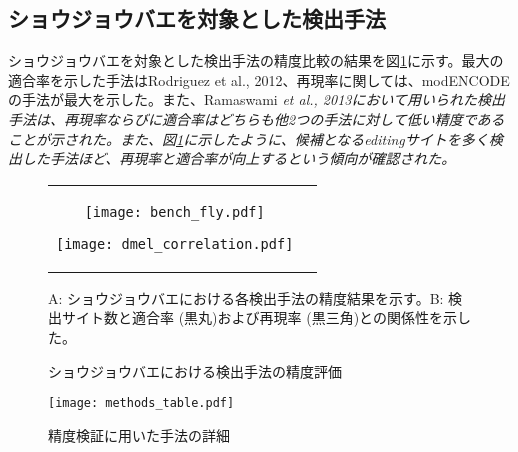 \subsection{ショウジョウバエを対象とした検出手法}
ショウジョウバエを対象とした検出手法の精度比較の結果を図\ref{fig:dmel_data}に示す。最大の適合率を示した手法はRodriguez et al., 2012、再現率に関しては、modENCODEの手法が最大を示した。また、Ramaswami \it{et al}\rm{}., 2013において用いられた検出手法は、再現率ならびに適合率はどちらも他2つの手法に対して低い精度であることが示された。また、図\ref{fig:dmel_data}に示したように、候補となるeditingサイトを多く検出した手法ほど、再現率と適合率が向上するという傾向が確認された。
\begin{figure}[htbp]
	\begin{tabular}{cc}
		\begin{minipage}{0.5\hsize}
				\centering
				\texttt{[image: bench\_fly.pdf]}
				\label{fig:dmel_pr}
		\end{minipage}
		\begin{minipage}{0.5\hsize}
				\centering
				\texttt{[image: dmel\_correlation.pdf]}
				\label{fig:dmel_cor}
		\end{minipage}
	\end{tabular}
	\caption{ショウジョウバエにおける検出手法の精度評価}
	\vspace*{-0.2cm}
	\label{fig:dmel_data}
	\begin{flushleft}
		\small{A: ショウジョウバエにおける各検出手法の精度結果を示す。B: 検出サイト数と適合率 (黒丸)および再現率 (黒三角)との関係性を示した。}
	\end{flushleft}
\end{figure}
\begin{figure}[htbp]
	\begin{center}
		\texttt{[image: methods\_table.pdf]}
	\end{center}
	\vspace*{-1cm}
	\caption{精度検証に用いた手法の詳細}
\end{figure}

\newpage


